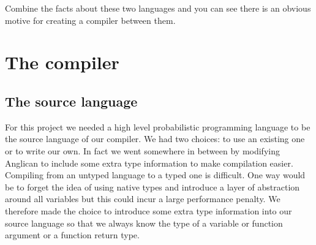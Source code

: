 \documentclass[a4paper]{article}
\begin{document}
Combine the facts about these two languages and you can see there is an obvious motive for creating a compiler between them.




\section{The compiler}




\subsection{The source language}

For this project we needed a high level probabilistic programming language to be the source language of our compiler. We had two choices: to use an existing one or to write our own. In fact we went somewhere in between by modifying Anglican to include some extra type information to make compilation easier. Compiling from an untyped language to a typed one is difficult. One way would be to forget the idea of using native types and introduce a layer of abstraction around all variables but this could incur a large performance penalty. We therefore made the choice to introduce some extra type information into our source language so that we always know the type of a variable or function argument or a function return type.
\end{document}
